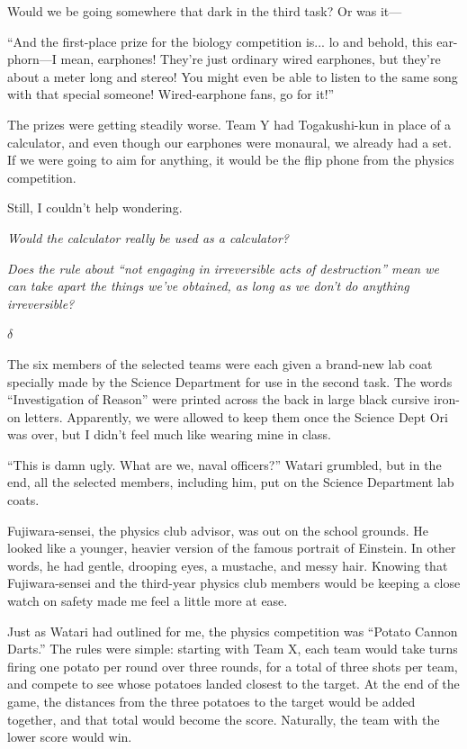 \documentclass[
    a4paper,
    12pt,
    twoside,
    openany,
    UTF8,
    fontset=windows
]{ctexbook}
\begin{document}
Would we be going somewhere that dark in the third task? Or was it---

``And the first-place prize for the biology competition is... lo and behold, this ear-phorn---I mean, earphones! They're just ordinary wired earphones, but they're about a meter long and stereo! You might even be able to listen to the same song with that special someone! Wired-earphone fans, go for it!''

The prizes were getting steadily worse. Team Y had Togakushi-kun in place of a calculator, and even though our earphones were monaural, we already had a set. If we were going to aim for anything, it would be the flip phone from the physics competition.

Still, I couldn't help wondering.

\textit{Would the calculator really be used as a calculator?}

\textit{Does the rule about ``not engaging in irreversible acts of destruction'' mean we can take apart the things we've obtained, as long as we don't do anything irreversible?}

$\delta$

The six members of the selected teams were each given a brand-new lab coat specially made by the Science Department for use in the second task. The words ``Investigation of Reason'' were printed across the back in large black cursive iron-on letters. Apparently, we were allowed to keep them once the Science Dept Ori was over, but I didn't feel much like wearing mine in class.

``This is damn ugly. What are we, naval officers?'' Watari grumbled, but in the end, all the selected members, including him, put on the Science Department lab coats.

Fujiwara-sensei, the physics club advisor, was out on the school grounds. He looked like a younger, heavier version of the famous portrait of Einstein. In other words, he had gentle, drooping eyes, a mustache, and messy hair. Knowing that Fujiwara-sensei and the third-year physics club members would be keeping a close watch on safety made me feel a little more at ease.

Just as Watari had outlined for me, the physics competition was ``Potato Cannon Darts.'' The rules were simple: starting with Team X, each team would take turns firing one potato per round over three rounds, for a total of three shots per team, and compete to see whose potatoes landed closest to the target. At the end of the game, the distances from the three potatoes to the target would be added together, and that total would become the score. Naturally, the team with the lower score would win.
\end{document}

